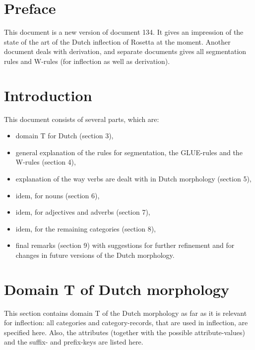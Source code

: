 
   \RosDate{\today}
   \MakeRosTitle


\section{Preface}

This document is a new version of document 134. It gives an impression
of the state of the art of the Dutch inflection of Rosetta at the moment. 
Another document deals with derivation, and 
separate documents gives all segmentation rules and W-rules (for inflection 
as well as derivation).

\newpage
\section{Introduction}

This document consists of several parts, which are:
\begin{itemize}
  \item domain T for Dutch (section 3),
  \item general explanation of the rules for segmentation, the GLUE-rules and 
        the W-rules (section 4),
  \item explanation of the way verbs are dealt with in Dutch morphology 
        (section 5),
  \item idem, for nouns (section 6),
  \item idem, for adjectives and adverbs (section 7),
  \item idem, for the remaining categories (section 8),
  \item final remarks (section 9) with suggestions for further refinement and
        for changes in future versions of the Dutch morphology.
\end{itemize} 


\newpage
\section{Domain T of Dutch morphology}

This section contains domain T of the Dutch morphology as far as it is
relevant for inflection: all categories and category-records, that are used
in inflection, are specified here. Also, the attributes (together with the 
possible attribute-values) and the suffix- and prefix-keys are listed here.

